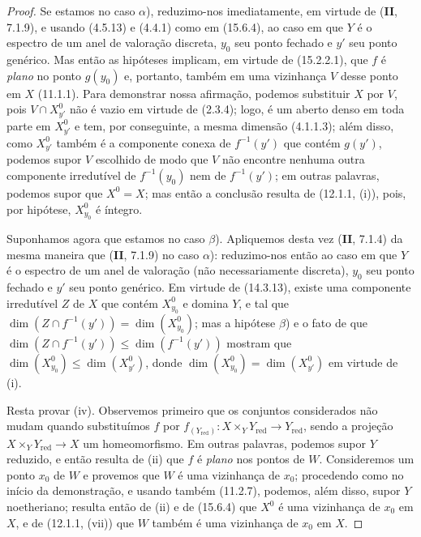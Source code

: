 \begin{proof}
Se estamos no caso $\alpha$), reduzimo-nos imediatamente, em virtude de (\textbf{II}, 7.1.9), e usando (4.5.13) e (4.4.1) como em (15.6.4), ao caso em que $Y$ é o espectro de um anel de valoração discreta, $y_0$ seu ponto fechado e $y'$ seu ponto genérico. Mas então as hipóteses implicam, em virtude de (15.2.2.1), que $f$ é \emph{plano} no ponto $g(y_0)$ e, portanto, também em uma vizinhança $V$ desse ponto em $X$ (11.1.1). Para demonstrar nossa afirmação, podemos substituir $X$ por $V$, pois $V\cap X_{y'}^0$ não é vazio em virtude de (2.3.4); logo, é um aberto denso em toda parte em $X_{y'}^0$ e tem, por conseguinte, a mesma dimensão (4.1.1.3); além disso, como $X_{y'}^0$ também é a componente conexa de $f^{-1}(y')$ que contém $g(y')$, podemos supor $V$ escolhido de modo que $V$ não encontre nenhuma outra componente irredutível de $f^{-1}(y_0)$ nem de $f^{-1}(y')$; em outras palavras, podemos supor que $X^0=X$; mas então a conclusão resulta de (12.1.1, (i)), pois, por hipótese, $X_{y_0}^0$ é íntegro.

Suponhamos agora que estamos no caso $\beta$). Apliquemos desta vez (\textbf{II}, 7.1.4) da mesma maneira que (\textbf{II}, 7.1.9) no caso $\alpha$): reduzimo-nos então ao caso em que $Y$ é o espectro de um anel de valoração (não necessariamente discreta), $y_0$ seu ponto fechado e $y'$ seu ponto genérico. Em virtude de (14.3.13), existe uma componente irredutível $Z$ de $X$ que contém $X_{y_0}^0$ e domina $Y$, e tal que $\dim(Z\cap f^{-1}(y'))=\dim(X_{y_0}^0)$; mas a hipótese $\beta$) e o fato de que $\dim(Z\cap f^{-1}(y'))\leqslant\dim(f^{-1}(y'))$ mostram que $\dim(X_{y_0}^0)\leqslant\dim(X_{y'}^0)$, donde $\dim(X_{y_0}^0)=\dim(X_{y'}^0)$ em virtude de (i).

Resta provar (iv). Observemos primeiro que os conjuntos considerados não mudam quando substituímos $f$ por $f_{(Y_{\mathrm{red}})}:X\times_Y Y_{\mathrm{red}}\to Y_{\mathrm{red}}$, sendo a projeção $X\times_Y Y_{\mathrm{red}}\to X$ um homeomorfismo. Em outras palavras, podemos supor $Y$ reduzido, e então resulta de (ii) que $f$ é \emph{plano} nos pontos de $W$. Consideremos um ponto $x_0$ de $W$ e provemos que $W$ é uma vizinhança de $x_0$; procedendo como no início da demonstração, e usando também (11.2.7), podemos, além disso, supor $Y$ noetheriano; resulta então de (ii) e de (15.6.4) que $X^0$ é uma vizinhança de $x_0$ em $X$, e de (12.1.1, (vii)) que $W$ também é uma vizinhança de $x_0$ em $X$.
\end{proof}

